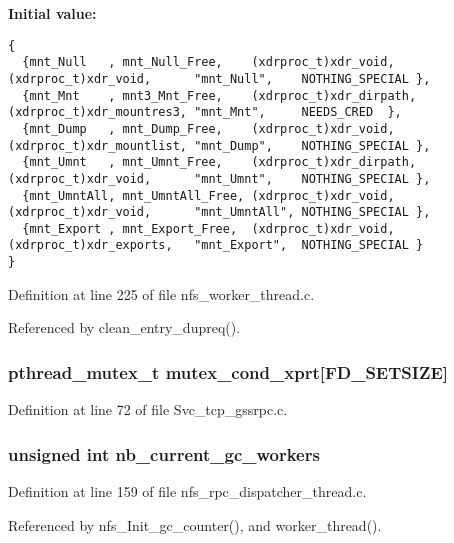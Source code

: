 {\bf Initial value:}

\footnotesize\begin{verbatim}
{
  {mnt_Null   , mnt_Null_Free,    (xdrproc_t)xdr_void,     (xdrproc_t)xdr_void,      "mnt_Null",    NOTHING_SPECIAL },
  {mnt_Mnt    , mnt3_Mnt_Free,    (xdrproc_t)xdr_dirpath,  (xdrproc_t)xdr_mountres3, "mnt_Mnt",     NEEDS_CRED  },
  {mnt_Dump   , mnt_Dump_Free,    (xdrproc_t)xdr_void,     (xdrproc_t)xdr_mountlist, "mnt_Dump",    NOTHING_SPECIAL },
  {mnt_Umnt   , mnt_Umnt_Free,    (xdrproc_t)xdr_dirpath,  (xdrproc_t)xdr_void,      "mnt_Umnt",    NOTHING_SPECIAL },
  {mnt_UmntAll, mnt_UmntAll_Free, (xdrproc_t)xdr_void,     (xdrproc_t)xdr_void,      "mnt_UmntAll", NOTHING_SPECIAL },
  {mnt_Export , mnt_Export_Free,  (xdrproc_t)xdr_void,     (xdrproc_t)xdr_exports,   "mnt_Export",  NOTHING_SPECIAL }
}
\end{verbatim}\normalsize 


Definition at line 225 of file nfs\_\-worker\_\-thread.c.

Referenced by clean\_\-entry\_\-dupreq().
\subsubsection{\setlength{\rightskip}{0pt plus 5cm}pthread\_\-mutex\_\-t {\bf mutex\_\-cond\_\-xprt}[FD\_\-SETSIZE]}\label{nfs__worker__thread_8c_a9}




Definition at line 72 of file Svc\_\-tcp\_\-gssrpc.c.
\subsubsection{\setlength{\rightskip}{0pt plus 5cm}unsigned int {\bf nb\_\-current\_\-gc\_\-workers}}\label{nfs__worker__thread_8c_a6}




Definition at line 159 of file nfs\_\-rpc\_\-dispatcher\_\-thread.c.

Referenced by nfs\_\-Init\_\-gc\_\-counter(), and worker\_\-thread().
